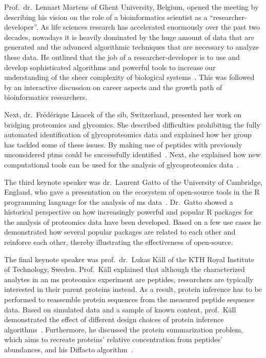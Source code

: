 \documentclass[fontsize=11pt, paper=a4, titlepage=false]{scrartcl}
\begin{document}
Prof.~dr.~Lennart Martens of Ghent University, Belgium, opened the meeting by 
describing his vision on the role of a bioinformatics scientist as a 
``researcher-developer''. As life sciences research has accelerated enormously 
over the past two decades, nowadays it is heavily dominated by the huge amount 
of data that are generated and the advanced algorithmic techniques that are 
necessary to analyze these data. He outlined that the job of a 
researcher-developer is to use and develop sophisticated algorithms and 
powerful tools to increase our understanding of the sheer complexity of 
biological systems~\autocite{Martens2015}. This was followed by an interactive 
discussion on career aspects and the growth path of bioinformatics researchers.

Next, dr.~Fr\'ed\'erique Lisacek of the \gls{sib}, 
Switzerland, presented her work on bridging proteomics and glycomics. She 
described difficulties prohibiting the fully automated identification of 
glycoproteomics data and explained how her group has tackled some of these 
issues. By making use of  peptides with previously 
unconsidered \glspl{ptm} could be successfully 
identified~\autocite{Horlacher2016}. Next, she explained how new computational 
tools can be used for the analysis of glycoproteomics 
data~\autocite{Horlacher2017}.

The third keynote speaker was dr.~Laurent Gatto of the University of Cambridge, 
England, who gave a presentation on the ecosystem of open-source tools in the R 
programming language for the analysis of \gls{ms} data~\autocite{Gatto2014}. 
Dr.~Gatto showed a historical perspective on how increasingly powerful and 
popular R packages for the analysis of proteomics data have been developed. 
Based on a few use cases he demonstrated how several popular packages are 
related to each other and reinforce each other, thereby illustrating the 
effectiveness of open-source.

The final keynote speaker was prof.~dr.~Lukas K\"all of the KTH Royal Institute 
of Technology, Sweden. Prof.~K\"all explained that although the characterized 
analytes in an \gls{ms} proteomics experiment are peptides, researchers are 
typically interested in their parent proteins instead. As a result, protein 
inference has to be performed to reassemble protein sequences from the measured 
peptide sequence data. Based on simulated data and a sample of known content, 
prof.~K\"all demonstrated the effect of different design choices of protein 
inference algorithms~\autocite{The2018}. Furthermore, he discussed the protein 
summarization problem, which aims to recreate proteins' relative concentration 
from peptides' abundances, and his Diffacto algorithm~\autocite{Zhang2017}.
\end{document}
